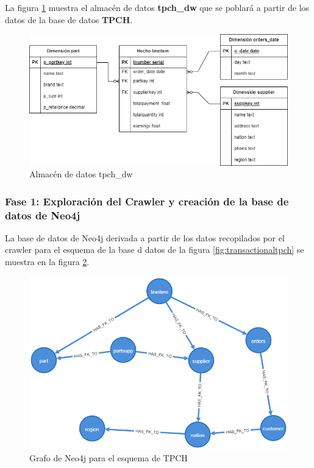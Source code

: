 La figura \ref{fig:warehousetpch} muestra el almacén de datos \textbf{tpch\_dw} que se poblar\'a a partir de los 
datos de la base de datos \textbf{TPCH}.

\begin{figure}[H]
  \centering
  \includegraphics[scale=0.5]{Graphics/tpch-tpch-warehouse.drawio.png}
  \caption{Almacén de datos tpch\_dw}
  \label{fig:warehousetpch}
\end{figure}

\subsubsection{Fase 1: Exploraci\'on del Crawler y creaci\'on de la base de datos de Neo4j}

La base de datos de Neo4j derivada a 
partir de los datos recopilados por el crawler para el esquema de la base d datos de la figura 
\ref{fig:transactionaltpch} se muestra en la figura \ref{fig:catalogexp2}.

\begin{figure}[H]
  \centering
  \includegraphics[scale=0.4]{Graphics/graph (2).png}
  \caption{Grafo de Neo4j para el esquema de TPCH}
  \label{fig:catalogexp2}
\end{figure}

